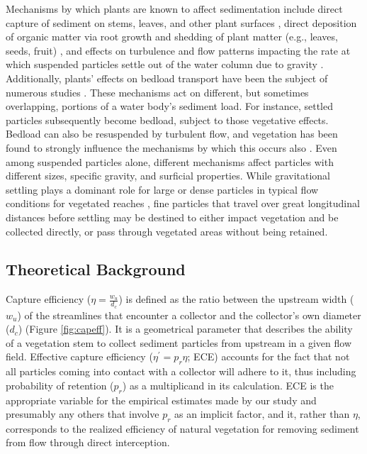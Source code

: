 \documentclass[geosciences,article,submit,moreauthors,pdftex]{Definitions/mdpi}
\begin{document}
Mechanisms by which plants are known to affect sedimentation include direct capture of sediment on stems, leaves, and other plant surfaces \cite{mudd2010does}, direct deposition of organic matter via root growth and shedding of plant matter (e.g., leaves, seeds, fruit) \cite{nyman2006marsh, neubauer2008contributions}, and effects on turbulence and flow patterns impacting the rate at which suspended particles settle out of the water column due to gravity \cite{christiansen2000flow, leonard1995flow}. Additionally, plants' effects on bedload transport have been the subject of numerous studies \cite[e.g.,][]{yager2013influence, yang2019impact, jordanova2003experimental}. These mechanisms act on different, but sometimes overlapping, portions of a water body's sediment load. For instance, settled particles subsequently become bedload, subject to those vegetative effects. Bedload can also be resuspended by turbulent flow, and vegetation has been found to strongly influence the mechanisms by which this occurs also \cite{tinoco2018turbulence}. Even among suspended particles alone, different mechanisms affect particles with different sizes, specific gravity, and surficial properties. While gravitational settling plays a dominant role for large or dense particles in typical flow conditions for vegetated reaches \cite{mudd2010does, leonard1995flow}, fine particles that travel over great longitudinal distances before settling may be destined to either impact vegetation and be collected directly, or pass through vegetated areas without being retained.

\subsection{Theoretical Background}

Capture efficiency ($\eta=\frac{w_u}{d_c}$) is defined as the ratio between the upstream width ($w_u$) of the streamlines that encounter a collector and the collector's own diameter ($d_c$) (Figure \ref{fig:capeff}). It is a geometrical parameter that describes the ability of a vegetation stem to collect sediment particles from upstream in a given flow field. Effective capture efficiency ($\eta^\prime=p_r\eta$; ECE) accounts for the fact that not all particles coming into contact with a collector will adhere to it, thus including probability of retention ($p_r$) as a multiplicand in its calculation. ECE is the appropriate variable for the empirical estimates made by our study and presumably any others that involve $p_r$ as an implicit factor, and it, rather than $\eta$, corresponds to the realized efficiency of natural vegetation for removing sediment from flow through direct interception.
\end{document}
